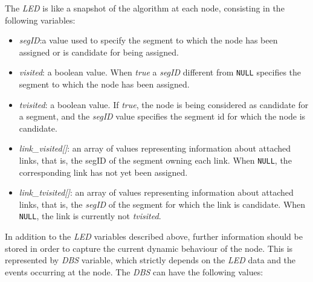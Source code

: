 The \emph{LED} is like a snapshot of the \disr{} algorithm at each node,
consisting in the following variables:
\begin{itemize}
\item{\emph{segID}}:a value used to specify the segment to which the
node has been assigned or is candidate for being assigned.
\item{\emph{visited}}: a boolean value. When \emph{true}
a \emph{segID} different from \texttt{NULL} specifies the segment 
to which the node has been assigned. 
\item{\emph{tvisited}}: a boolean value. If \emph{true}, the node is
being considered as candidate for a segment, and the \emph{segID} value
specifies the segment id for which the node is candidate. 
\item{\emph{link\_visited[]}}: an array
of values representing information about attached links, that is, the
segID of the segment owning each link. When \texttt{NULL}, the corresponding link has not yet been
assigned.
\item{\emph{link\_tvisited[]}}: an array of
values representing information about attached links, that is, the \emph{segID} of
the segment for which the link is candidate. When \texttt{NULL}, the link is
currently not \emph{tvisited}.  
\end{itemize}

In addition to the \emph{LED} variables described above, further
information should be stored in order to capture the current dynamic
behaviour of the node. This is represented by \emph{DBS} variable,
which strictly depends on the \emph{LED} data and the events occurring
at the node. The \emph{DBS} can have the following values:

